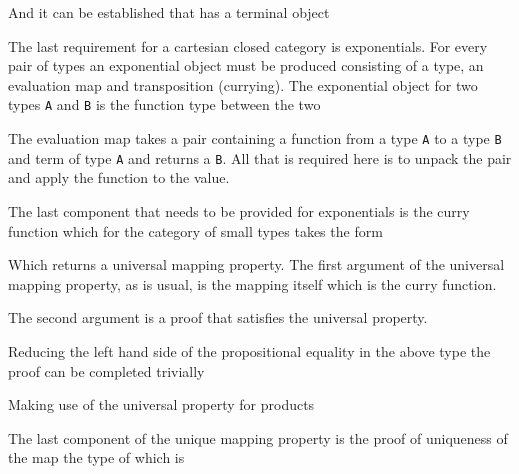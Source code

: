 And it can be established that  has a terminal object



The last requirement for a cartesian closed category is exponentials. For every
pair of types an exponential object must be produced consisting of a type, an
evaluation map and transposition (currying). The exponential object for two
types \verb|A| and \verb|B| is the function type between the two


The evaluation map takes a pair containing a function from a type \verb|A| to a
type \verb|B| and term of type \verb|A| and returns a \verb|B|. All that is
required here is to unpack the pair and apply the function to the value.


The last component that needs to be provided for exponentials is the curry
function which for the category of small types takes the form


Which returns a universal mapping property. The first argument of the universal
mapping property, as is
usual, is the mapping itself which is the curry function.



The second argument is a proof that  satisfies the
universal property.


Reducing the left hand side of the propositional equality in the above type the
proof can be completed trivially


Making use of the universal property for products


The last component of the unique mapping property is the proof of uniqueness of
the map the type of which is



